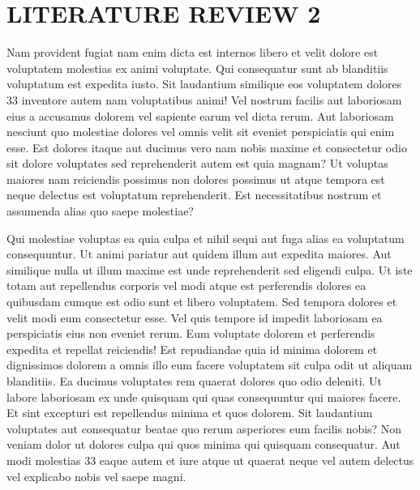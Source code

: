 \documentclass[a4paper,12pt]{report}
\begin{document}
\section{LITERATURE REVIEW 2}
\hspace{.5cm} Nam provident fugiat nam enim dicta est internos libero et velit dolore est voluptatem molestias ex animi voluptate. Qui consequatur sunt ab blanditiis voluptatum est expedita iusto. Sit laudantium similique eos voluptatem dolores 33 inventore autem nam voluptatibus animi! Vel nostrum facilis aut laboriosam eius a accusamus dolorem vel sapiente earum vel dicta rerum. Aut laboriosam nesciunt quo molestiae dolores vel omnis velit sit eveniet perspiciatis qui enim esse. Est dolores itaque aut ducimus vero nam nobis maxime et consectetur odio sit dolore voluptates sed reprehenderit autem est quia magnam? Ut voluptas maiores nam reiciendis possimus non dolores possimus ut atque tempora est neque delectus est voluptatum reprehenderit. Est necessitatibus nostrum et assumenda alias quo saepe molestiae?

\par Qui molestiae voluptas ea quia culpa et nihil sequi aut fuga alias ea voluptatum consequuntur. Ut animi pariatur aut quidem illum aut expedita maiores. Aut similique nulla ut illum maxime est unde reprehenderit sed eligendi culpa. Ut iste totam aut repellendus corporis vel modi atque est perferendis dolores ea quibusdam cumque est odio sunt et libero voluptatem. Sed tempora dolores et velit modi eum consectetur esse. Vel quis tempore id impedit laboriosam ea perspiciatis eius non eveniet rerum. Eum voluptate dolorem et perferendis expedita et repellat reiciendis! Est repudiandae quia id minima dolorem et dignissimos dolorem a omnis illo eum facere voluptatem sit culpa odit ut aliquam blanditiis. Ea ducimus voluptates rem quaerat dolores quo odio deleniti. Ut labore laboriosam ex unde quisquam qui quas consequuntur qui maiores facere. Et sint excepturi est repellendus minima et quos dolorem. Sit laudantium voluptates aut consequatur beatae quo rerum asperiores eum facilis nobis? Non veniam dolor ut dolores culpa qui quos minima qui quisquam consequatur. Aut modi molestias 33 eaque autem et iure atque ut quaerat neque vel autem delectus vel explicabo nobis vel saepe magni. 
\end{document}
